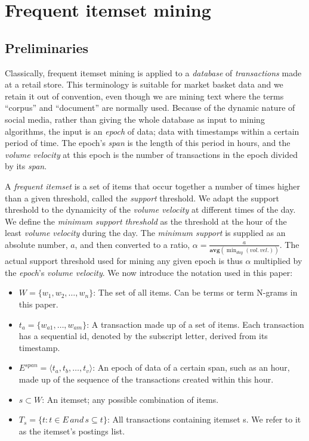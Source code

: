 \documentclass{sig-alternate}
\begin{document}
\section{Frequent itemset mining}
\label{sec:fim}
\subsection{Preliminaries}
Classically, frequent itemset mining is applied to a \emph{database} of
\emph{transactions} made at a retail store.
This terminology is suitable for market basket data and we retain it out of
convention, even though we are mining text where the terms ``corpus'' and
``document'' are normally used.
Because of the dynamic nature of social media, rather than giving the whole
database as input to mining algorithms, the input is an \emph{epoch} of data;
data with timestamps within a certain period of time.
The epoch's \emph{span} is the length of this period in hours,
and the \emph{volume velocity} at this epoch is the number of transactions in the epoch
divided by its \emph{span}.

A \emph{frequent itemset} is a set of items that occur together a number of
times higher than a given threshold, called the \emph{support} threshold.
We adapt the support threshold to the dynamicity of the \emph{volume velocity} at
different times of the day.
We define the \emph{minimum support threshold} as the threshold at the hour
of the least \emph{volume velocity} during the day.
The \emph{minimum support} is supplied as an absolute number, $a$, and then
converted to a ratio, $\alpha = \frac{a}{\textbf{avg}(\min_{day}{(vol.\, vel.)})}$.
The actual support threshold used for mining any given epoch is thus
$\alpha$ multiplied by the \emph{epoch}'s \emph{volume velocity}. 
We now introduce the notation used in this paper:
\begin{itemize}
\item $W = \{w_1,w_2,\ldots, w_n\}$: The set of all items. Can be terms or term N-grams in this paper.
\item $t_a = \{w_{a1},\ldots, w_{am}\}$: A transaction made up of a set of items. Each transaction has a sequential id, denoted by the subscript letter, derived from its timestamp.
\item $E^{span} = \langle t_a, t_b, \ldots, t_v\rangle$: An epoch of data of a certain span, such as an hour, made up of the sequence of the transactions created within this hour.
\item $s \subset W$: An itemset; any possible combination of items. 
\item $T_s = \{t: t \in E \, and \, s \subseteq t\}$: All transactions containing itemset s. We refer to it as the itemset's postings list.
\end{itemize}
\end{document}
